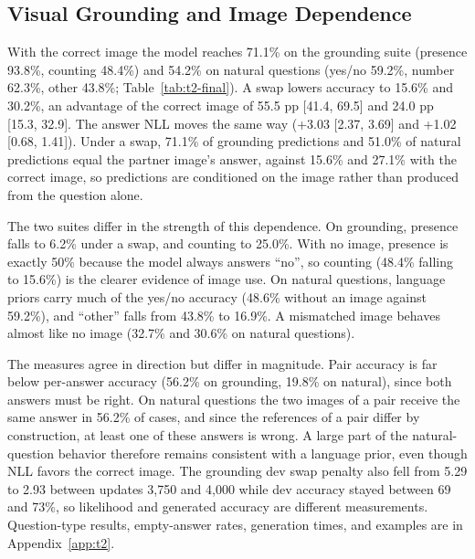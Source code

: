\documentclass{article}
\begin{document}
\subsection{Visual Grounding and Image Dependence}
With the correct image the model reaches 71.1\% on the grounding suite (presence 93.8\%, counting 48.4\%) and 54.2\% on natural questions (yes/no 59.2\%, number 62.3\%, other 43.8\%; Table~\ref{tab:t2-final}). A swap lowers accuracy to 15.6\% and 30.2\%, an advantage of the correct image of 55.5 pp [41.4, 69.5] and 24.0 pp [15.3, 32.9]. The answer NLL moves the same way (+3.03 [2.37, 3.69] and +1.02 [0.68, 1.41]). Under a swap, 71.1\% of grounding predictions and 51.0\% of natural predictions equal the partner image's answer, against 15.6\% and 27.1\% with the correct image, so predictions are conditioned on the image rather than produced from the question alone.

The two suites differ in the strength of this dependence. On grounding, presence falls to 6.2\% under a swap, and counting to 25.0\%. With no image, presence is exactly 50\% because the model always answers ``no'', so counting (48.4\% falling to 15.6\%) is the clearer evidence of image use. On natural questions, language priors carry much of the yes/no accuracy (48.6\% without an image against 59.2\%), and ``other'' falls from 43.8\% to 16.9\%. A mismatched image behaves almost like no image (32.7\% and 30.6\% on natural questions).

The measures agree in direction but differ in magnitude. Pair accuracy is far below per-answer accuracy (56.2\% on grounding, 19.8\% on natural), since both answers must be right. On natural questions the two images of a pair receive the same answer in 56.2\% of cases, and since the references of a pair differ by construction, at least one of these answers is wrong. A large part of the natural-question behavior therefore remains consistent with a language prior, even though NLL favors the correct image. The grounding dev swap penalty also fell from 5.29 to 2.93 between updates 3,750 and 4,000 while dev accuracy stayed between 69 and 73\%, so likelihood and generated accuracy are different measurements. Question-type results, empty-answer rates, generation times, and examples are in Appendix~\ref{app:t2}.
\end{document}
